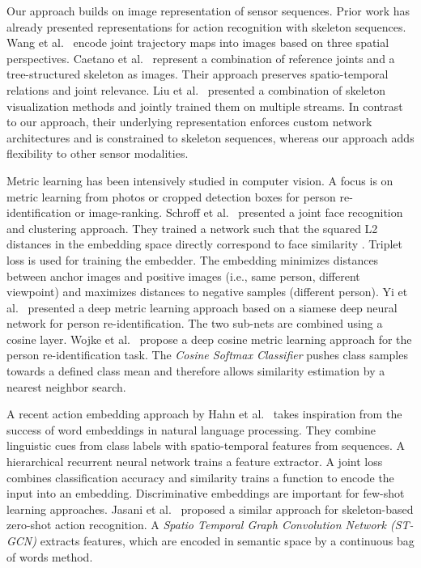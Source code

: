 \documentclass[10pt,conference,a4paper]{IEEEtran}
\def\andothers{et al.\ }
\begin{document}
Our approach builds on image representation of sensor sequences. Prior work has already presented representations for action recognition with 
skeleton sequences. Wang \andothers \cite{wang2018action} encode joint trajectory maps into images based on three spatial perspectives. Caetano \andothers \cite{caetano2019skelemotion, caetano2019skeleton} represent a combination of reference joints and a tree-structured skeleton as images. Their approach preserves spatio-temporal relations and joint relevance. 
Liu \andothers \cite{liu2017enhanced} presented a combination of skeleton visualization methods and jointly trained them on multiple streams. 
In contrast to our approach, their underlying representation enforces custom network architectures and is constrained to skeleton sequences, whereas our approach adds flexibility to other sensor modalities.


Metric learning has been intensively studied in computer vision. A focus is on metric learning from photos or cropped detection boxes for person re-identification or image-ranking.
Schroff \andothers \cite{schroff2015facenet} presented a joint face recognition and clustering approach. They trained a network such that the squared L2 distances in the embedding space directly correspond to face similarity \cite{schroff2015facenet}. Triplet loss \cite{weinberger2009distance} is used for training the embedder. The embedding minimizes distances between anchor images and positive images (i.e., same person, different viewpoint) and maximizes distances to negative samples (different person).
Yi \andothers \cite{yi2014deep} presented a deep metric learning approach based on a siamese deep neural network for person re-identification.  The two sub-nets are combined using a cosine layer.
Wojke \andothers \cite{wojke2018deep} propose a deep cosine metric learning approach for the person re-identification task. The \textit{Cosine Softmax Classifier} pushes class samples towards a defined class mean and therefore allows similarity estimation by a nearest neighbor search. 




A recent action embedding approach by Hahn \andothers \cite{hahn2019action2vec} takes inspiration from the success of word embeddings in natural language processing. They combine linguistic cues from class labels with spatio-temporal features from sequences. A hierarchical recurrent neural network trains a  feature extractor. 
A joint loss combines classification accuracy and similarity trains a function to encode the input into an embedding. Discriminative embeddings are important for few-shot learning approaches. Jasani \andothers \cite{jasani2019skeleton} proposed a similar approach for skeleton-based zero-shot action recognition. 
A \textit{Spatio Temporal Graph Convolution Network (ST-GCN)} \cite{yan2018spatial}  extracts features, which are encoded in semantic space by a continuous bag of words method.
\end{document}
